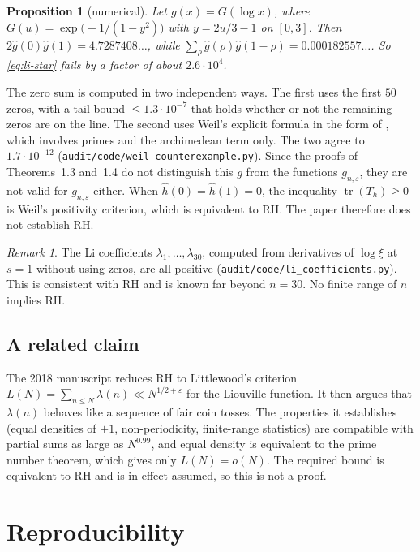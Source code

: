 \documentclass[reqno,11pt]{amsart}
\numberwithin{equation}{section}
\theoremstyle{plain}
\newtheorem{proposition}[theorem]{Proposition}
\theoremstyle{remark}
\newtheorem{remark}[theorem]{Remark}
\newcommand{\eps}{\varepsilon}
\DeclareMathOperator{\tr}{tr}
\begin{document}
\begin{proposition}[numerical]\label{prop:li}
Let $g(x)=G(\log x)$, where $G(u)=\exp\bigl(-1/(1-y^2)\bigr)$ with
$y=2u/3-1$ on $[0,3]$. Then $2\hat g(0)\hat g(1)=4.7287408\ldots$, while
$\sum_\rho\hat g(\rho)\hat g(1-\rho)=0.000182557\ldots$. So
\eqref{eq:li-star} fails by a factor of about $2.6\cdot10^4$.
\end{proposition}

The zero sum is computed in two independent ways. The first uses the first
$50$ zeros, with a tail bound $\le1.3\cdot10^{-7}$ that holds whether or not
the remaining zeros are on the line. The second uses Weil's explicit formula
in the form of \cite{Bom00}, which involves primes and the archimedean term
only. The two agree to $1.7\cdot10^{-12}$
(\texttt{audit/code/weil\_counterexample.py}). Since the proofs of
Theorems~1.3 and~1.4 do not distinguish this $g$ from the functions $g_{n,\eps}$,
they are not valid for $g_{n,\eps}$ either. When $\hat h(0)=\hat h(1)=0$, the
inequality $\tr(T_h)\ge0$ is Weil's positivity criterion, which is equivalent
to RH. The paper therefore does not establish RH.

\begin{remark}
The Li coefficients $\lambda_1,\dots,\lambda_{30}$, computed from derivatives
of $\log\xi$ at $s=1$ without using zeros, are all positive
(\texttt{audit/code/li\_coefficients.py}). This is consistent with RH and
is known far beyond $n=30$. No finite range of $n$ implies RH.
\end{remark}

\subsection{A related claim}
The 2018 manuscript \cite{Esw18} reduces RH to Littlewood's criterion
$L(N)=\sum_{n\le N}\lambda(n)\ll N^{1/2+\eps}$ for the Liouville function. It
then argues that $\lambda(n)$ behaves like a sequence of fair coin tosses. The
properties it establishes (equal densities of $\pm1$, non-periodicity,
finite-range statistics) are compatible with partial sums as large as
$N^{0.99}$, and equal density is equivalent to the prime number theorem, which
gives only $L(N)=o(N)$. The required bound is equivalent to RH and is in effect
assumed, so this is not a proof.

\section{Reproducibility}\label{s:repro}
\end{document}

